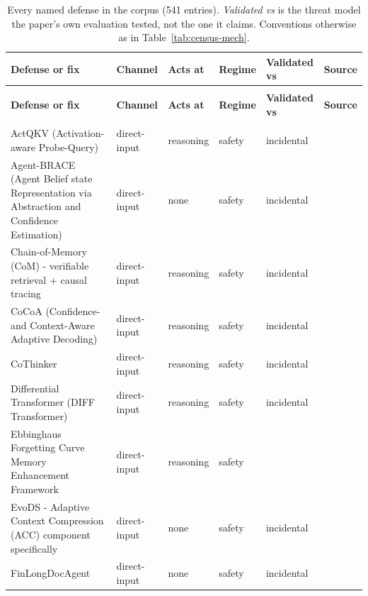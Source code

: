 \begingroup
\footnotesize
\setlength{\tabcolsep}{3.5pt}
\begin{longtable}{@{}>{\raggedright\arraybackslash}p{}lllll@{}}
\caption{Every named defense in the corpus (541 entries). \emph{Validated vs} is the threat model the paper's own evaluation tested, not the one it claims. Conventions otherwise as in Table~\ref{tab:census-mech}.}\\
\toprule
\textbf{Defense or fix} & \textbf{Channel} & \textbf{Acts at} & \textbf{Regime} & \textbf{Validated vs} & \textbf{Source} \\
\midrule
\endfirsthead
\multicolumn{6}{l}{\emph{Table~\ref{tab:census-def}: named defenses, continued}} \\
\toprule
\textbf{Defense or fix} & \textbf{Channel} & \textbf{Acts at} & \textbf{Regime} & \textbf{Validated vs} & \textbf{Source} \\
\midrule
\endhead
\midrule
\multicolumn{6}{r}{\emph{continued}} \\
\endfoot
\bottomrule
\endlastfoot
ActQKV (Activation-aware Probe-Query) & direct-input & reasoning & safety & incidental & \cite{xiao-2025-activationaware} \\
Agent-BRACE (Agent Belief state Representation via Abstraction and Confidence Estimation) & direct-input & none & safety & incidental & \cite{singh-2026-agentbrace} \\
Chain-of-Memory (CoM) - verifiable retrieval + causal tracing & direct-input & reasoning & safety & incidental & \cite{jarsania-2025-chainofmemory} \\
CoCoA (Confidence- and Context-Aware Adaptive Decoding) & direct-input & reasoning & safety & incidental & \cite{khandelwal-2025-cocoa} \\
CoThinker & direct-input & reasoning & safety & incidental & \cite{shang-2025-united} \\
Differential Transformer (DIFF Transformer) & direct-input & reasoning & safety & incidental & \cite{ye-2024-differential} \\
Ebbinghaus Forgetting Curve Memory Enhancement Framework & direct-input & reasoning & safety &  & \cite{jiang-2026-ebbinghaus} \\
EvoDS - Adaptive Context Compression (ACC) component specifically & direct-input & none & safety & incidental & \cite{yang-2026-evods} \\
FinLongDocAgent & direct-input & none & safety & incidental & \cite{wang-2026-documentlevel} \\

\end{longtable}
